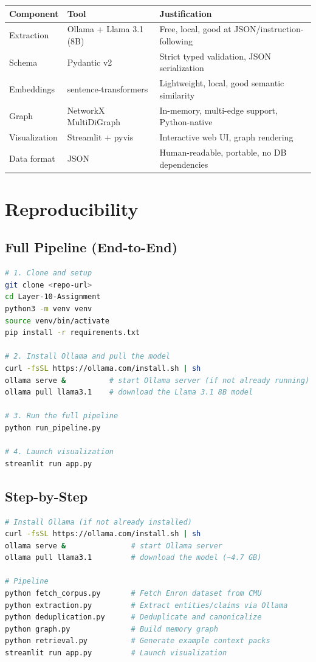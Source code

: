\documentclass[11pt,a4paper]{article}
\begin{document}
\begin{center}
\begin{tabular}{lll}
\toprule
\textbf{Component} & \textbf{Tool} & \textbf{Justification} \\
\midrule
Extraction & Ollama + Llama 3.1 (8B) & Free, local, good at JSON/instruction-following \\
Schema & Pydantic v2 & Strict typed validation, JSON serialization \\
Embeddings & sentence-transformers & Lightweight, local, good semantic similarity \\
Graph & NetworkX MultiDiGraph & In-memory, multi-edge support, Python-native \\
Visualization & Streamlit + pyvis & Interactive web UI, graph rendering \\
Data format & JSON & Human-readable, portable, no DB dependencies \\
\bottomrule
\end{tabular}
\end{center}

\section{Reproducibility}

\subsection{Full Pipeline (End-to-End)}
\begin{lstlisting}[language=bash]
# 1. Clone and setup
git clone <repo-url>
cd Layer-10-Assignment
python3 -m venv venv
source venv/bin/activate
pip install -r requirements.txt

# 2. Install Ollama and pull the model
curl -fsSL https://ollama.com/install.sh | sh
ollama serve &          # start Ollama server (if not already running)
ollama pull llama3.1    # download the Llama 3.1 8B model

# 3. Run the full pipeline
python run_pipeline.py

# 4. Launch visualization
streamlit run app.py
\end{lstlisting}

\subsection{Step-by-Step}
\begin{lstlisting}[language=bash]
# Install Ollama (if not already installed)
curl -fsSL https://ollama.com/install.sh | sh
ollama serve &               # start Ollama server
ollama pull llama3.1         # download the model (~4.7 GB)

# Pipeline
python fetch_corpus.py       # Fetch Enron dataset from CMU
python extraction.py         # Extract entities/claims via Ollama
python deduplication.py      # Deduplicate and canonicalize
python graph.py              # Build memory graph
python retrieval.py          # Generate example context packs
streamlit run app.py         # Launch visualization
\end{lstlisting}
\end{document}
